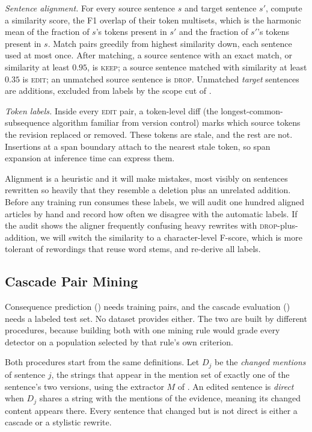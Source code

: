 \documentclass[]{paper}
\newcommand{\keep}{\textsc{keep}}
\newcommand{\edit}{\textsc{edit}}
\newcommand{\drop}{\textsc{drop}}
\begin{document}
\emph{Sentence alignment.} For every source sentence $s$ and target sentence $s'$, compute a similarity score, the F1 overlap of their token multisets, which is the harmonic mean of the fraction of $s$'s tokens present in $s'$ and the fraction of $s'$'s tokens present in $s$. Match pairs greedily from highest similarity down, each sentence used at most once. After matching, a source sentence with an exact match, or similarity at least $0.95$, is \keep{}; a source sentence matched with similarity at least $0.35$ is \edit{}; an unmatched source sentence is \drop{}. Unmatched \emph{target} sentences are additions, excluded from labels by the scope cut of .

\emph{Token labels.} Inside every \edit{} pair, a token-level diff (the longest-common-subsequence algorithm familiar from version control) marks which source tokens the revision replaced or removed. These tokens are stale, and the rest are not. Insertions at a span boundary attach to the nearest stale token, so span expansion at inference time can express them.

Alignment is a heuristic and it will make mistakes, most visibly on sentences rewritten so heavily that they resemble a deletion plus an unrelated addition. Before any training run consumes these labels, we will audit one hundred aligned articles by hand and record how often we disagree with the automatic labels. If the audit shows the aligner frequently confusing heavy rewrites with \drop{}-plus-addition, we will switch the similarity to a character-level F-score, which is more tolerant of rewordings that reuse word stems, and re-derive all labels.

\subsection{Cascade Pair Mining}
\label{sec:mining}

Consequence prediction () needs training pairs, and the cascade evaluation () needs a labeled test set. No dataset provides either. The two are built by different procedures, because building both with one mining rule would grade every detector on a population selected by that rule's own criterion.

Both procedures start from the same definitions. Let $D_j$ be the \emph{changed mentions} of sentence $j$, the strings that appear in the mention set of exactly one of the sentence's two versions, using the extractor $M$ of . An edited sentence is \emph{direct} when $D_j$ shares a string with the mentions of the evidence, meaning its changed content appears there. Every sentence that changed but is not direct is either a cascade or a stylistic rewrite.
\end{document}
